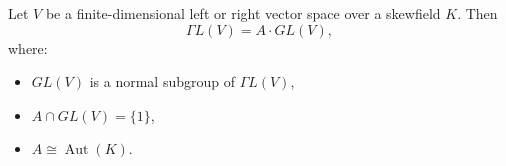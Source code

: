 Let $V$ be a finite-dimensional left or right vector space over a skewfield $K$. Then
$$\Gamma L(V) = A \cdot GL(V),$$
where:
\begin{itemize}
\item $GL(V)$ is a normal subgroup of $\Gamma L(V)$,
\item $A \cap GL(V) = \{1\}$,
\item $A \cong \operatorname{Aut}(K)$.
\end{itemize}
